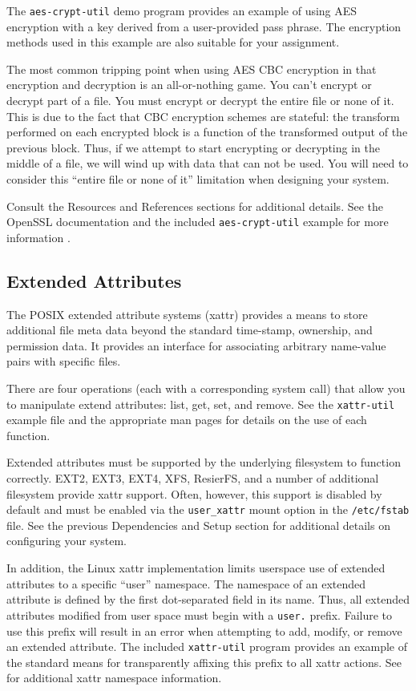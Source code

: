 \documentclass[12pt]{article}
\begin{document}
The \texttt{aes-crypt-util} demo program provides an example of using
AES encryption with a key derived from a user-provided pass phrase. The
encryption methods used in this example are also suitable for your
assignment.

The most common tripping point when using AES CBC
encryption in that encryption and decryption is an all-or-nothing
game. You can't encrypt or decrypt part of a file. You must encrypt or
decrypt the entire file or none of it. This is due to the fact that CBC
encryption schemes are stateful: the transform performed on each
encrypted block is a function of the transformed output of the previous
block. Thus, if we attempt to start encrypting or decrypting in
the middle of a file, we will wind up with data that can not be
used. You will need to consider this ``entire file or none of it''
limitation when designing your system.

Consult the Resources and References sections for additional
details. See the OpenSSL documentation and the included
\texttt{aes-crypt-util} example for more information
\cite{openssl-website,openssl-docs,openssl-evp,pillai-aes}.

\subsection{Extended Attributes}

The POSIX extended attribute systems (xattr) provides a means to
store additional file meta data beyond the standard time-stamp,
ownership, and permission data. It provides an interface for
associating arbitrary name-value pairs with specific files.

There are four operations (each with a corresponding system call) that
allow you to manipulate extend attributes: list, get, set, and
remove. See the \texttt{xattr-util} example file and the appropriate man
pages for details on the use of each function.

Extended attributes must be supported by the underlying filesystem to
function correctly. EXT2, EXT3, EXT4, XFS, ResierFS, and a number of
additional filesystem provide xattr support. Often, however, this
support is disabled by default and must be enabled via the
\texttt{user\_xattr} mount option in the \texttt{/etc/fstab} file. See
the previous Dependencies and Setup section for additional details on
configuring your system.

In addition, the Linux xattr implementation limits userspace use of
extended attributes to a specific ``user'' namespace. The namespace of an
extended attribute is defined by the first dot-separated field in its
name. Thus, all extended attributes modified from user space must begin
with a \texttt{user.} prefix. Failure to use this prefix will result in
an error when attempting to add, modify, or remove an extended
attribute. The included \texttt{xattr-util} program provides an
example of the standard means for transparently affixing this prefix
to all xattr actions. See \cite{freedesktop-xattr} for additional
xattr namespace information.
\end{document}
